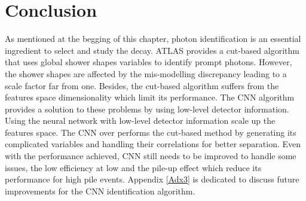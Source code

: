 \section{Conclusion}
\label{gamma:conc}



As mentioned at the begging of this chapter, photon identification is an essential ingredient to select and study the \HHyybb decay. ATLAS provides a cut-based algorithm that uses global shower shapes variables to identify prompt photons. However, the shower shapes are affected by the mis-modelling discrepancy leading to a scale factor far from one. Besides, the cut-based algorithm suffers from the features space dimensionality which limit its performance. The CNN algorithm provides a solution to these problems by using low-level detector information. Using the neural network with low-level detector information scale up the features space. The CNN over performs the cut-based method by generating its complicated variables and handling their correlations for better separation. Even with the performance achieved, CNN still needs to be improved to handle some issues, the low efficiency at low \eT and the pile-up effect which reduce its performance for high pile events. Appendix \ref{Adx3} is dedicated to discuss future improvements for the CNN identification algorithm. 
